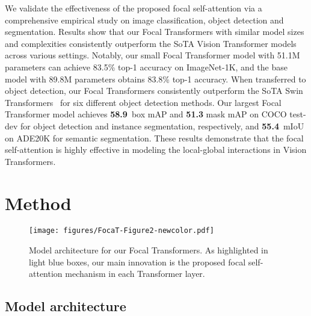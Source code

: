 \documentclass{article}
\newcommand{\cocotestdevboxmapms}{\textbf{58.9}}
\newcommand{\adevalms}{\textbf{55.4}}
\begin{document}
We validate the effectiveness of the proposed focal self-attention via a comprehensive empirical study on  image classification, object detection and segmentation. 
Results show that our Focal Transformers with similar model sizes and complexities consistently outperform the SoTA Vision Transformer models across various settings. Notably, our small Focal Transformer model with 51.1M parameters can achieve 83.5\% top-1 accuracy on ImageNet-1K, and the base model with 89.8M parameters obtains 83.8\% top-1 accuracy. When transferred to object detection, our Focal Transformers consistently outperform the SoTA Swin Transformers~\cite{liu2021swin} for six different object detection methods. Our largest Focal Transformer model achieves \cocotestdevboxmapms~box mAP and \textbf{51.3} mask mAP on COCO test-dev for object detection and instance segmentation, respectively, and \adevalms~mIoU on ADE20K for semantic segmentation. These results demonstrate that the focal self-attention is highly effective in  modeling the local-global interactions in Vision Transformers.
 \section{Method}
\vspace{-2mm}
\begin{figure}[t!]
\centering
    \texttt{[image: figures/FocaT-Figure2-newcolor.pdf]}
  \caption{Model architecture for our Focal Transformers. As highlighted in light blue boxes, our main innovation is the proposed focal self-attention mechanism in each Transformer layer.}
  \label{fig:model_architecture}
\end{figure}
\subsection{Model architecture}
\end{document}
